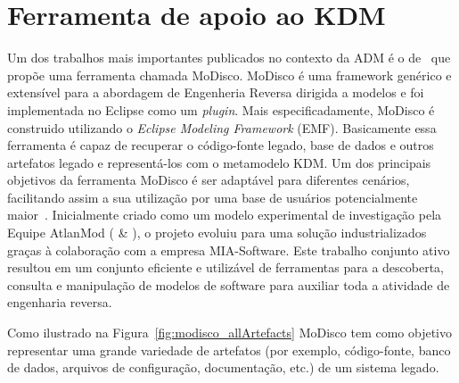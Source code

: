 



\section{Ferramenta de apoio ao KDM}

Um dos trabalhos mais importantes publicados no contexto da ADM é o de~ que propõe uma ferramenta chamada MoDisco. MoDisco é uma framework genérico e extensível para a abordagem de Engenheria Reversa dirigida a modelos e foi implementada no  Eclipse como um \textit{plugin}. Mais especificadamente, MoDisco é construido utilizando o \textit{Eclipse Modeling Framework} (EMF). Basicamente essa ferramenta é capaz de recuperar o código-fonte legado, base de dados e outros artefatos legado e representá-los com o metamodelo KDM. Um dos principais objetivos da ferramenta MoDisco é ser adaptável para diferentes cenários, facilitando assim a sua utilização por uma base de usuários potencialmente maior~\cite{Bruneliere_2014}. Inicialmente criado como um modelo experimental de investigação pela Equipe AtlanMod ( \& ), o projeto evoluiu para uma solução industrializados graças à colaboração com a empresa MIA-Software. Este trabalho conjunto ativo resultou em um conjunto eficiente e utilizável de ferramentas para a descoberta, consulta e manipulação de modelos de software para auxiliar toda a atividade de engenharia reversa.

Como ilustrado na Figura~\ref{fig:modisco_allArtefacts} MoDisco tem como objetivo representar uma grande variedade de artefatos (por exemplo, código-fonte, banco de dados, arquivos de configuração, documentação, etc.) de um sistema legado. 

